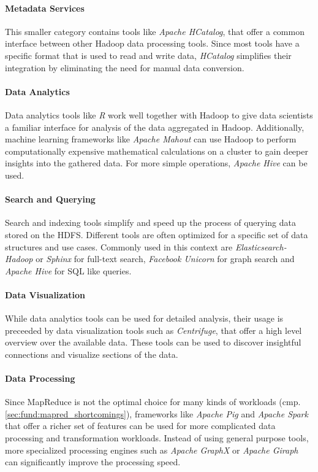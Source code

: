 \paragraph{Metadata Services}
This smaller category contains tools like \emph{Apache HCatalog}, 
that offer a common interface between other Hadoop data processing tools. 
Since most tools have a specific format that is used to read and write data, 
\emph{HCatalog} simplifies their integration by eliminating 
the need for manual data conversion.\autocite{bmc2017hcatalog}

\paragraph{Data Analytics}
Data analytics tools like \emph{R} work well together with Hadoop to give data scientists 
a familiar interface for analysis of the data aggregated in Hadoop. 
Additionally, machine learning frameworks like \emph{Apache Mahout} can use Hadoop 
to perform computationally expensive mathematical calculations 
on a cluster to gain deeper insights into the gathered data. 
For more simple operations, \emph{Apache Hive} can be used.

\paragraph{Search and Querying}
Search and indexing tools simplify and speed up the process of querying data stored on the \ac{HDFS}. Different tools are often optimized for a specific set of data structures and use cases. Commonly used in this context are \emph{Elasticsearch-Hadoop} or \emph{Sphinx} for full-text search, \emph{Facebook Unicorn} for graph search and \emph{Apache Hive} for \ac{SQL} like queries.

\paragraph{Data Visualization}
While data analytics tools can be used for detailed analysis, 
their usage is preceeded by data visualization tools such as \emph{Centrifuge}, 
that offer a high level overview over the available data. 
These tools can be used to discover insightful connections and visualize sections of the data.

\paragraph{Data Processing}
Since MapReduce is not the optimal choice for many kinds of workloads (cmp. \ref{sec:fund:mapred_shortcomings}), frameworks like \emph{Apache Pig} and \emph{Apache Spark} that offer a richer set of features can be used for more complicated data processing and transformation workloads. Instead of using general purpose tools, more specialized processing engines such as \emph{Apache GraphX} or \emph{Apache Giraph} can significantly improve the processing speed.

